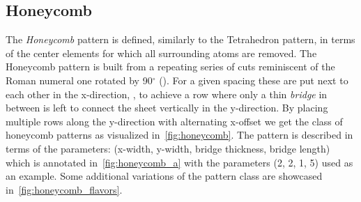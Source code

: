 \subsection{Honeycomb}
The \textit{Honeycomb} pattern is defined, similarly to the Tetrahedron pattern,
in terms of the center elements for which all surrounding atoms are removed. The
Honeycomb pattern is built from a repeating series of cuts reminiscent of the
Roman numeral one rotated by 90$^{\circ}$
(). For a given spacing
these are put next to each other in the x-direction,
, to achieve a row
where only a thin \textit{bridge} in between is left to connect the sheet
vertically in the y-direction. By placing multiple rows along the y-direction
with alternating x-offset we get the class of honeycomb patterns as visualized
in~\cref{fig:honeycomb}. The pattern is described in terms of the parameters:
(x-width, y-width, bridge thickness, bridge length) which is annotated
in~\cref{fig:honeycomb_a} with the parameters (2, 2, 1, 5) used as an example.
Some additional variations of the pattern class are showcased
in~\cref{fig:honeycomb_flavors}.


